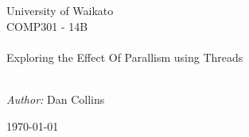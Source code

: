 \begin{titlepage}
\begin{center}

\Large University of Waikato\\[1.5cm]
\Large COMP301 - 14B\\[0.5cm]

\HRule \\[0.4cm] \Large \huge Exploring the Effect Of Parallism using Threads\\[0.4cm] \HRule \\[1.5cm]

\begin{minipage}{\textwidth}
  \centering
  \emph{Author:} Dan Collins
\end{minipage}

\vfill

{\large \today}

\end{center}
\end{titlepage}

